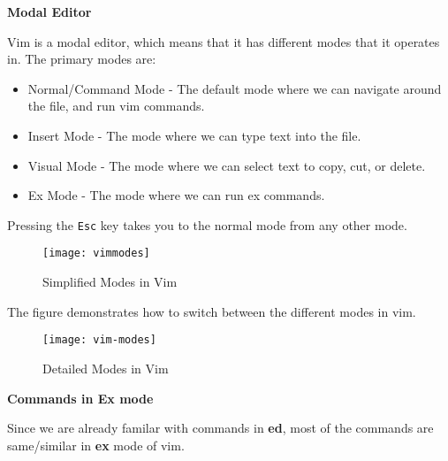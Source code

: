 \textbf{Modal Editor}


Vim is a modal editor, which means that it has different modes
that it operates in. The primary modes are:

\begin{itemize}
  \item Normal/Command Mode - The default mode where we can navigate
    around the file, and run vim commands.
  \item Insert Mode - The mode where we can type text into the file.
  \item Visual Mode - The mode where we can select text to copy, cut, or delete.
  \item Ex Mode - The mode where we can run ex commands.
\end{itemize}

Pressing the \lstinline|Esc| key takes you to the normal mode
from any other mode.

\begin{figure}[h!]
  \texttt{[image: vimmodes]}
  \caption{Simplified Modes in Vim}
\end{figure}

The figure  demonstrates how to switch between
the different modes in vim.

\begin{figure*}[h]
  \texttt{[image: vim-modes]}
  \caption{Detailed Modes in Vim}
\end{figure*}

\textbf{Commands in Ex mode}

Since we are already familar with commands in
\textbf{ed}, most of the commands are same/similar
in \textbf{ex} mode of vim.


